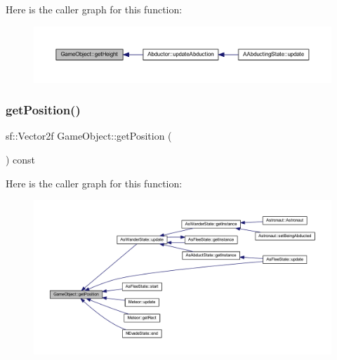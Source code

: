 Here is the caller graph for this function\+:
\nopagebreak
\begin{figure}[H]
\begin{center}
\leavevmode
\includegraphics[width=350pt]{class_game_object_a927400453a0989e2f5b765031f4d861c_icgraph}
\end{center}
\end{figure}
\mbox{\label{class_game_object_a43a1f9dafe383a47a20abb51919e9e79}} 
\subsubsection{\texorpdfstring{get\+Position()}{getPosition()}}
{\footnotesize\ttfamily sf\+::\+Vector2f Game\+Object\+::get\+Position (\begin{DoxyParamCaption}{ }\end{DoxyParamCaption}) const}

Here is the caller graph for this function\+:
\nopagebreak
\begin{figure}[H]
\begin{center}
\leavevmode
\includegraphics[width=350pt]{class_game_object_a43a1f9dafe383a47a20abb51919e9e79_icgraph}
\end{center}
\end{figure}
\mbox{\label{class_game_object_aecc23e1558ae04e10083deae74774bd2}} 

